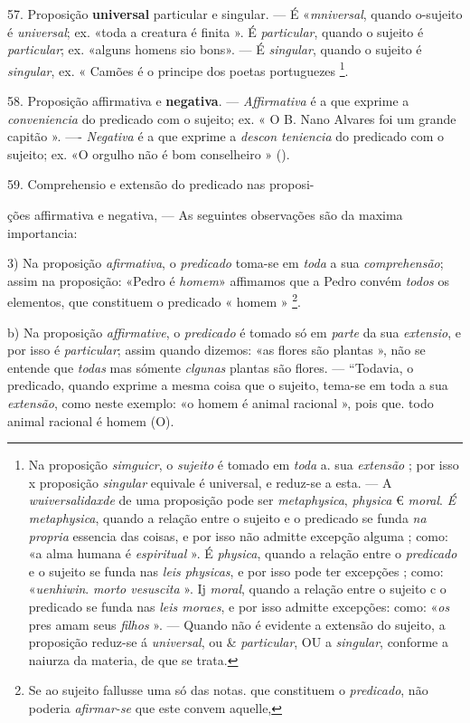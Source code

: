 57. Proposição \textbf{universal} particular e singular. --- É «\emph{mniversal}, quando o-sujeito é \emph{universal}; ex. «toda a creatura é finita ». É \emph{particular}, quando o sujeito é \emph{particular}; ex. «alguns homens sio bons». --- É \emph{singular}, quando o sujeito é \emph{singular}, ex. « Camões é o principe dos poetas portuguezes \footnote{Na proposição \emph{simguicr}, o \emph{sujeito} é tomado em \emph{toda} a. sua \emph{extensão} ; por isso x proposição \emph{singular} equivale é universal, e reduz-se a esta. --- A \emph{wuiversalidaxde} de uma proposição pode ser \emph{metaphysica}, \emph{physica} € \emph{moral}. \emph{É metaphysica}, quando a relação entre o sujeito e o predicado se funda \emph{na propria} essencia das coisas, e por isso não admitte excepção alguma ; como: «a alma humana é \emph{espiritual} ». É \emph{physica}, quando a relação entre o \emph{predicado} e o sujeito se funda nas \emph{leis physicas}, e por isso pode ter excepções ; como: «\emph{uenhiwin}. \emph{morto vesuscita} ». Ij \emph{moral}, quando a relação entre o sujeito c o predicado se funda nas \emph{leis moraes}, e por isso admitte excepções: como: «\emph{os} pres amam seus \emph{filhos} ». --- Quando não é evidente a extensão do sujeito, a proposição reduz-se á \emph{universal}, ou \& \emph{particular}, OU a \emph{singular}, conforme a naiurza da materia, de que se trata.}.

58. Proposição affirmativa e \textbf{negativa}. --- \emph{Affirmativa} é a que exprime a \emph{conveniencia} do predicado com o sujeito; ex. « O B. Nano Alvares foi um grande capitão ». ---- \emph{Negativa} é a que exprime a \emph{descon teniencia} do predicado com o sujeito; ex. «O orgulho não é bom conselheiro » ().

59. Comprehensio e extensão do predicado nas proposi-

ções affirmativa e negativa, --- As seguintes observações são da maxima importancia: \textbar{}

3) Na proposição \emph{afirmativa}, o \emph{predicado} toma-se em \emph{toda} a sua \emph{comprehensão}; assim na proposição: «Pedro é \emph{homem}» affimamos que a Pedro convém \emph{todos} os elementos, que constituem o predicado « homem » \footnote{Se ao sujeito fallusse uma só das notas. que constituem o \emph{predicado}, não poderia \emph{afirmar-se} que este convem aquelle,}. \textbar{}

b) Na proposição \emph{affirmative}, o \emph{predicado} é tomado só em \emph{parte} da sua \emph{extensio}, e por isso é \emph{particular}; assim quando dizemos: «as flores são plantas », não se entende que \emph{todas} mas sómente \emph{clgunas} plantas são flores. --- “Todavia, o predicado, quando exprime a mesma coisa que o sujeito, tema-se em toda a sua \emph{extensão}, como neste exemplo: «o homem é animal racional », pois que. todo animal racional é homem (O). \textbar{}

